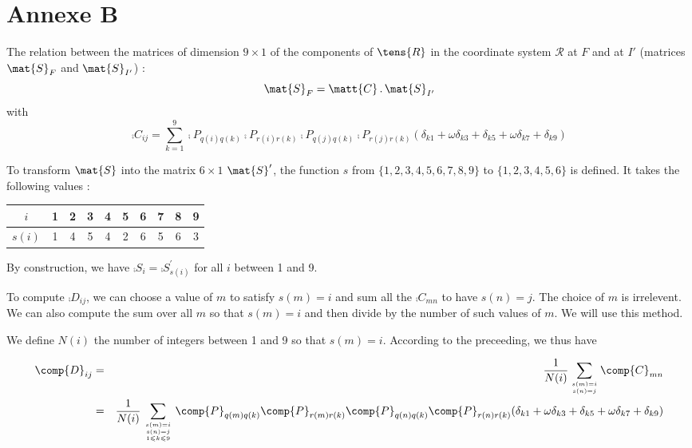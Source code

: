 \section*{Annexe B}

The relation between the matrices of dimension $9\times1$
of the components of $\tens{R}$ in the coordinate system $\mathcal{R}$ at $F$ and at $I'$
(matrices $\mat{S}_F$ and $\mat{S}_{I'}$) :
\begin{equation}
\mat{S}_F=\matt{C}\,.\,\mat{S}_{I'}
\end{equation}
with
\begin{equation}
\comp{C}_{ij}=\sum_{k=1}^9
\comp{P}_{q(i)q(k)}\comp{P}_{r(i)r(k)}\comp{P}_{q(j)q(k)}\comp{P}_{r(j)r(k)}
(\delta_{k1}+\omega\delta_{k3}+\delta_{k5}+\omega\delta_{k7}+\delta_{k9})
\end{equation}

To transform $\mat{S}$ into the matrix $6\times 1$ $\mat{S}^\prime$,
the function $s$ from $\{1,2,3,4,5,6,7,8,9\}$ to
$\{1,2,3,4,5,6\}$ is defined. It takes the following values :
\begin{center}
\begin{tabular}{|c|c|c|c|c|c|c|c|c|c|}
\hline
$i$&1&2&3&4&5&6&7&8&9\\
\hline
$s(i)$&1&4&5&4&2&6&5&6&3\\
\hline
\end{tabular}
\end{center}
By construction, we have $\comp{S}_i=\comp{S}^\prime_{s(i)}$ for all $i$ between 1
and 9.

To compute $\comp{D}_{ij}$, we can choose a value of $m$ to satisfy
$s(m)=i$ and sum all the $\comp{C}_{mn}$ to have $s(n)=j$. The choice of $m$
is irrelevent. We can also compute the sum over all $m$ so that  $s(m)=i$ and then
divide by the number of such values of $m$. We will use this method.

We define $N(i)$ the number of integers between 1 and 9 so that $s(m)=i$.
According to the preceeding, we thus have

\begin{eqnarray}
\comp{D}_{ij}&=&\frac{1}{N(i)}\sum_{s(m)=i \atop s(n)=j}\comp{C}_{mn}\nonumber\\
&=&\frac{1}{N(i)}\sum_{{s(m)=i \atop s(n)=j}\atop 1\leqslant k\leqslant 9}
\comp{P}_{q(m)q(k)}\comp{P}_{r(m)r(k)}\comp{P}_{q(n)q(k)}\comp{P}_{r(n)r(k)}
(\delta_{k1}+\omega\delta_{k3}+\delta_{k5}+\omega\delta_{k7}+\delta_{k9})
\end{eqnarray}

